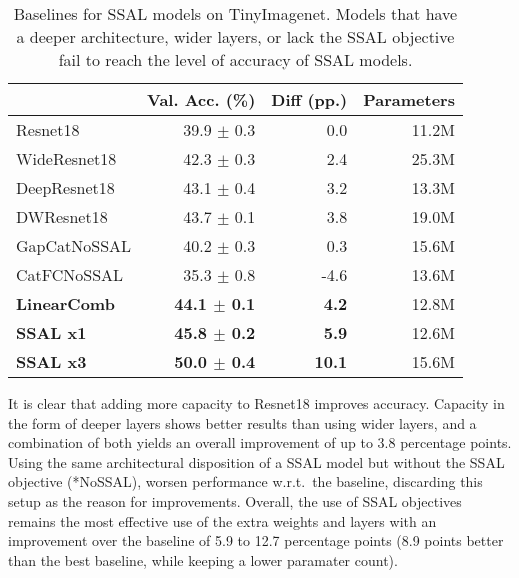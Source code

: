 \documentclass[10pt,twocolumn,letterpaper]{article}
\begin{document}
\begin{table}[t]
\centering
\begin{tabular}{@{}lrrr@{}}
\toprule
                 & Val. Acc. (\%)         & Diff (pp.)     & Parameters        \\ \midrule
Resnet18         & 39.9 $\pm$ 0.3          & 0.0           & 11.2M             \\
WideResnet18     & 42.3 $\pm$ 0.3          & 2.4           & 25.3M             \\
DeepResnet18     & 43.1 $\pm$ 0.4          & 3.2           & 13.3M             \\
DWResnet18       & 43.7 $\pm$ 0.1          & 3.8           & 19.0M             \\ \midrule
GapCatNoSSAL     & 40.2 $\pm$ 0.3          & 0.3           & 15.6M             \\
CatFCNoSSAL      & 35.3 $\pm$ 0.8          & -4.6          & 13.6M             \\ \midrule
\textbf{LinearComb}  & \textbf{44.1 $\pm$ 0.1} & \textbf{4.2}  & 12.8M             \\
\textbf{SSAL x1} & \textbf{45.8 $\pm$ 0.2} & \textbf{5.9}  & 12.6M             \\
\textbf{SSAL x3} & \textbf{50.0 $\pm$ 0.4} & \textbf{10.1} & 15.6M             \\ \bottomrule
\end{tabular}
\caption{Baselines for SSAL models on TinyImagenet. Models that have a deeper architecture, wider layers, or lack the SSAL objective fail to reach the level of accuracy of SSAL models.}
\label{tab:baselines}
\end{table}

It is clear that adding more capacity to Resnet18 improves accuracy.
Capacity in the form of deeper layers shows better results than using wider layers, and a combination of both yields an overall improvement of up to 3.8 percentage points.
Using the same architectural disposition of a SSAL model but without the SSAL objective (*NoSSAL), worsen performance w.r.t.~the baseline, discarding this setup as the reason for improvements.
Overall, the use of SSAL objectives remains the most effective use of the extra weights and layers with an improvement over the baseline of 5.9 to 12.7 percentage points (8.9 points better than the best baseline, while keeping a lower paramater count).
\end{document}
